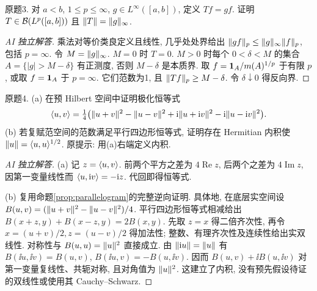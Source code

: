 \begin{exercise}\label{ps07:3}
原题3. 对 $a<b$, $1\le p\le\infty$, $g\in L^\infty([a,b])$, 定义 $Tf=gf$. 证明 $T\in\mathcal B(L^p([a,b]))$ 且 $\lVert T\rVert=\lVert g\rVert_\infty$.
\end{exercise}
\begin{proof}[AI 独立解答]
乘法对等价类良定义且线性, 几乎处处界给出 $\lVert gf\rVert_p\le\lVert g\rVert_\infty\lVert f\rVert_p$, 包括 $p=\infty$. 令 $M=\lVert g\rVert_\infty$. $M=0$ 时 $T=0$. $M>0$ 时每个 $0<\delta<M$ 的集合 $A=\{|g|>M-\delta\}$ 有正测度, 否则 $M-\delta$ 是本质界. 取 $f=\mathbf 1_A/m(A)^{1/p}$ 于有限 $p$, 或取 $f=\mathbf 1_A$ 于 $p=\infty$. 它们范数为1, 且 $\lVert Tf\rVert_p\ge M-\delta$. 令 $\delta\downarrow0$ 得反向界.
\end{proof}
\begin{exercise}\label{ps07:4}
原题4. (a) 在预 Hilbert 空间中证明极化恒等式
\[
\langle u,v\rangle=\tfrac14\bigl(\lVert u+v\rVert^2-\lVert u-v\rVert^2+\mathrm i\lVert u+\mathrm i v\rVert^2-\mathrm i\lVert u-\mathrm i v\rVert^2\bigr).
\]
(b) 若复赋范空间的范数满足平行四边形恒等式, 证明存在 Hermitian 内积使 $\lVert u\rVert=\langle u,u\rangle^{1/2}$. 原提示: 用(a)右端定义内积.
\end{exercise}
\begin{proof}[AI 独立解答]
(a) 记 $z=\langle u,v\rangle$. 前两个平方之差为 $4\operatorname{Re}z$, 后两个之差为 $4\operatorname{Im}z$, 因第一变量线性而 $\langle u,\mathrm i v\rangle=-\mathrm i z$. 代回即得恒等式.

(b) 复用命题\ref{prop:parallelogram}的完整逆向证明. 具体地, 在底层实空间设 $B(u,v)=(\lVert u+v\rVert^2-\lVert u-v\rVert^2)/4$. 平行四边形恒等式相减给出 $B(x+z,y)+B(x-z,y)=2B(x,y)$. 先取 $z=x$ 得二倍齐次性, 再令 $x=(u+v)/2,z=(u-v)/2$ 得加法性; 整数、有理齐次性及连续性给出实双线性. 对称性与 $B(u,u)=\lVert u\rVert^2$ 直接成立. 由 $\lVert \mathrm i u\rVert=\lVert u\rVert$ 有 $B(\ii u,\ii v)=B(u,v)$, $B(\ii u,v)=-B(u,\ii v)$. 因而 $B(u,v)+\ii B(u,\ii v)$ 对第一变量复线性、共轭对称, 且对角值为 $\lVert u\rVert^2$. 这建立了内积, 没有预先假设待证的双线性或使用其 Cauchy--Schwarz.
\end{proof}
